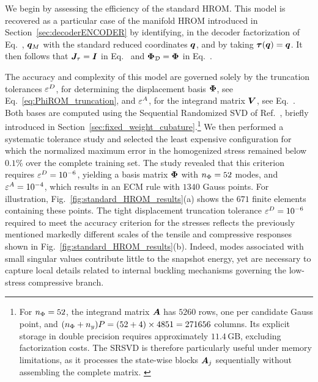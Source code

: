 \documentclass[preprint,10pt]{elsarticle}  %
\begin{document}
We begin by assessing the
efficiency of the standard HROM. This
model is recovered as a particular case of the manifold HROM introduced
in Section~\ref{sec:decoderENCODER} by identifying, in the decoder
factorization of Eq.~,  \(\bm{q}_M\) with the standard reduced coordinates
\(\bm{q}\), and by taking \(\bm{\tau}(\bm{q})=\bm{q}\). It then follows that
\(\bm{J}_{\tau}=\bm{I}\) in Eq.~ and
\(\bm{\Phi}_{\mathcal{D}}=\bm{\Phi}\) in Eq.~.


 The accuracy and complexity of this model are governed solely by the
truncation tolerances $\varepsilon^D$, for determining the displacement basis  \(\bm{\Phi}\), see Eq.~\ref{eq:PhiROM_truncation}, and   \(\varepsilon^A\), for the integrand matrix \(\bm{V}\), see Eq.~.  Both bases are computed using the
Sequential Randomized SVD   of
Ref.~\cite{hernandez2024cecm}, briefly introduced in
Section~\ref{sec:fixed_weight_cubature}.\footnote{For
\(n_{\Phi}=52\), the integrand matrix \(\bm{A}\) has \(5260\) rows, one per
candidate Gauss point, and
\((n_{\Phi}+n_{{y}})P=(52+4)\times4851=271656\) columns. Its explicit
storage in double precision requires approximately \(11.4\,\mathrm{GB}\),
excluding factorization costs. The SRSVD is therefore particularly useful
under memory limitations, as it processes the state-wise blocks
\(\bm{A}_j\) sequentially without assembling the complete matrix. \label{footnote:size}}
We then performed a systematic tolerance study and selected the least
expensive configuration for which the normalized maximum error in the
homogenized stress remained below \(0.1\%\) over the complete training
set. The study revealed that this criterion requires \(\varepsilon^D=10^{-6}\), yielding a basis matrix $\bm{\Phi}$ with
\(n_{\Phi}=52\) modes, and  \(\varepsilon^A=10^{-4}\), which results in an
ECM rule with \(1340\) Gauss points. For illustration,
Fig.~\ref{fig:standard_HROM_results}(a) shows the \(671\) finite elements
containing these points. The tight displacement truncation tolerance
\(\varepsilon^D=10^{-6}\) required to meet the accuracy criterion for the stresses reflects the previously mentioned
markedly different scales of the tensile and compressive responses shown
in Fig.~\ref{fig:standard_HROM_results}(b). Indeed, modes associated with small
singular values contribute little to the snapshot energy, yet are necessary to  capture local details related to
 internal buckling mechanisms governing the low-stress compressive
branch.
\end{document}
